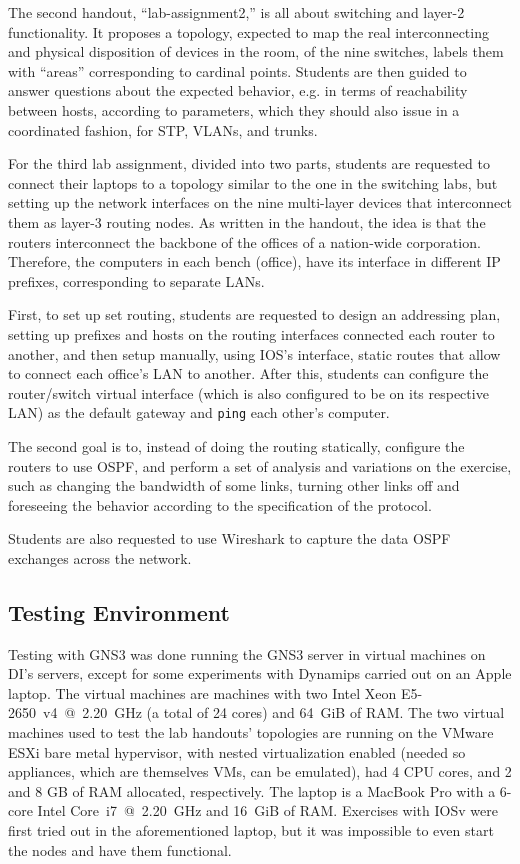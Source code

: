 The second handout, ``lab-assignment2,'' is all about switching and layer-2 functionality.
It proposes a topology, expected to map the real interconnecting and physical disposition of devices in the room, of the nine switches, labels them with ``areas'' corresponding to cardinal points.
Students are then guided to answer questions about the expected behavior, e.g. in terms of reachability between hosts, according to parameters, which they should also issue in a coordinated fashion, for STP, VLANs, and trunks.

For the third lab assignment, divided into two parts, students are requested to connect their laptops to a topology similar to the one in the switching labs, but setting up the network interfaces on the nine multi-layer devices that interconnect them as layer-3 routing nodes.
As written in the handout, the idea is that the routers interconnect the backbone of the offices of a nation-wide corporation.
Therefore, the computers in each bench (office), have its interface in different IP prefixes, corresponding to separate LANs. %

First, to set up set routing, students are requested to design an addressing plan, setting up prefixes and hosts on the routing interfaces connected each router to another, and then setup manually, using IOS's interface, static routes that allow to connect each office's LAN to another.
After this, students can configure the router/switch virtual interface (which is also configured to be on its respective LAN) as the default gateway and \texttt{ping} each other's computer.

The second goal is to, instead of doing the routing statically, configure the routers to use OSPF, and perform a set of analysis and variations on the exercise, such as changing the bandwidth of some links, turning other links off and foreseeing the behavior according to the specification of the protocol.

Students are also requested to use Wireshark to capture the data OSPF exchanges across the network.

\subsection{Testing Environment}
\label{subsec:environment}

Testing with GNS3 was done running the GNS3 server in virtual machines on DI's servers, except for some experiments with Dynamips carried out on an Apple laptop. %
The virtual machines are machines with two Intel Xeon E5-2650~v4~@~2.20~GHz (a total of 24 cores) and 64~GiB of RAM.
The two virtual machines used to test the lab handouts' topologies are running on the VMware ESXi bare metal hypervisor, with nested virtualization enabled (needed so appliances, which are themselves VMs, can be emulated), had 4 CPU cores, and 2 and 8 GB of RAM allocated, respectively.
The laptop is a MacBook Pro with a 6-core Intel Core~i7~@~2.20~GHz and 16~GiB of RAM.
Exercises with IOSv were first tried out in the aforementioned laptop, but it was impossible to even start the nodes and have them functional.

